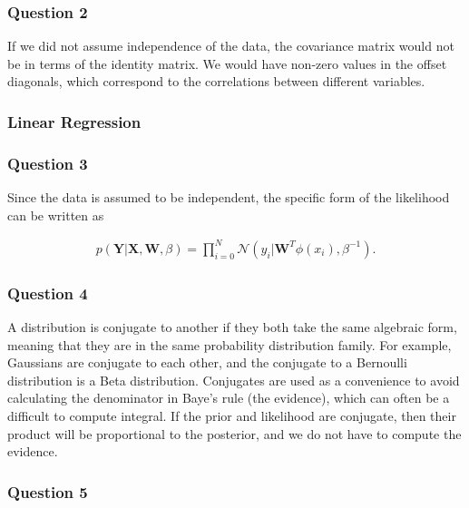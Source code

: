 \documentclass[10pt, a4paper, twocolumn]{article} %
\begin{document}

\subsubsection*{Question 2}
If we did not assume independence of the data, the covariance matrix would not be in terms of the identity matrix. We would have non-zero values in the offset diagonals, which correspond to the correlations between different variables.

\subsubsection{Linear Regression}

\subsubsection*{Question 3}

Since the data is assumed to be independent, the specific form of the likelihood can be written as

\begin{align}
  p(\mathbf{Y} | \mathbf{X}, \mathbf{W}, \beta) = \prod_{i=0}^N \mathcal{N} (y_i | \mathbf{W}^T\phi(x_i), \beta^{-1}) .
\end{align}

\subsubsection*{Question 4}

A distribution is conjugate to another if they both take the same algebraic form, meaning that they are in the same probability distribution family. For example, Gaussians are conjugate to each other, and the conjugate to a Bernoulli distribution is a Beta distribution. Conjugates are used as a convenience to avoid calculating the denominator in Baye's rule (the evidence), which can often be a difficult to compute integral. If the prior and likelihood are conjugate, then their product will be proportional to the posterior, and we do not have to compute the evidence.


\subsubsection*{Question 5}
\end{document}
